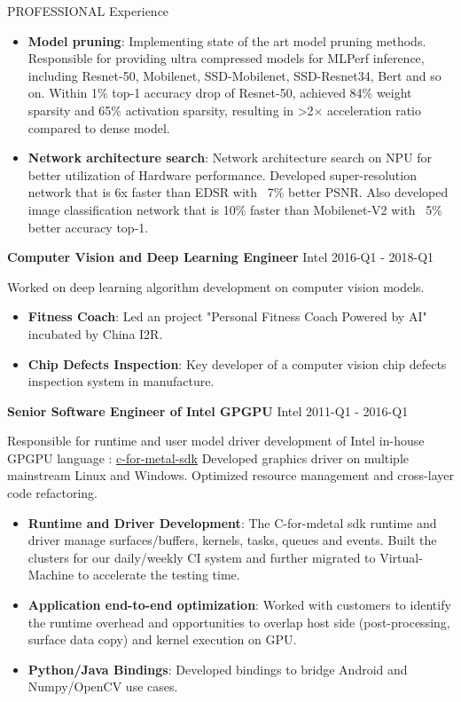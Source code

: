 \documentclass{resume} %
\begin{document}
\begin{rSection}{PROFESSIONAL Experience}
\begin{itemize}
\item \textbf{Model pruning}: 
Implementing state of the art model pruning methods.
Responsible for providing ultra compressed models for MLPerf inference, including Resnet-50, Mobilenet, SSD-Mobilenet, SSD-Resnet34, Bert and so on. 
Within 1\% top-1 accuracy drop of Resnet-50, achieved 84\% weight sparsity and 65\% activation sparsity, resulting in \textgreater 2$\times$ acceleration ratio compared to dense model.
\item \textbf{Network architecture search}: 
Network architecture search on NPU for better utilization of Hardware performance. Developed super-resolution network that is 6x faster than EDSR with ~7\% better PSNR. 
Also developed image classification network that is 10\% faster than Mobilenet-V2 with ~5\% better accuracy top-1.
\end{itemize}


\textbf{Computer Vision and Deep Learning Engineer} \hfill Intel 2016-Q1 - 2018-Q1

Worked on deep learning algorithm development on computer vision models. 
\begin{itemize}
\item \textbf{Fitness Coach}: Led an project "Personal Fitness Coach Powered by AI" incubated by China I2R.
\item \textbf{Chip Defects Inspection}: Key developer of a computer vision chip defects inspection system in manufacture.
\end{itemize}

\textbf{Senior Software Engineer of Intel GPGPU} \hfill Intel 2011-Q1 - 2016-Q1

Responsible for runtime and user model driver development of Intel in-house GPGPU language : \href{<https://www.intel.com/content/www/us/en/developer/tools/open/c-for-metal-sdk/overview.html>}{c-for-metal-sdk}
Developed graphics driver on multiple mainstream Linux and Windows. Optimized resource management and cross-layer code refactoring.

\begin{itemize}

\item \textbf{Runtime and Driver Development}: The C-for-mdetal sdk runtime and driver  manage surfaces/buffers, kernels, tasks, queues and events. Built the clusters for our daily/weekly CI system and further migrated to Virtual-Machine to accelerate the testing time.
\item \textbf{Application end-to-end optimization}: Worked with customers to identify the runtime overhead and opportunities to overlap host side (post-processing, surface data copy) and kernel execution on GPU.
\item \textbf{Python/Java Bindings}: Developed bindings to bridge Android and Numpy/OpenCV use cases.


\end{itemize}
\end{rSection}
\end{document}
